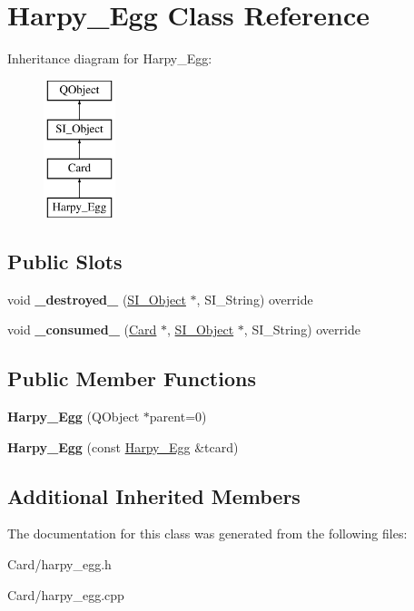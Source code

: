 \hypertarget{class_harpy___egg}{}\section{Harpy\+\_\+\+Egg Class Reference}
\label{class_harpy___egg}
Inheritance diagram for Harpy\+\_\+\+Egg\+:\begin{figure}[H]
\begin{center}
\leavevmode
\includegraphics[height=4.000000cm]{class_harpy___egg}
\end{center}
\end{figure}
\subsection*{Public Slots}
\begin{DoxyCompactItemize}
\item 
\mbox{\label{class_harpy___egg_a39fe155847c9a08db0183bc72f2f457a}} 
void {\bfseries \+\_\+destroyed\+\_\+} (\hyperlink{class_s_i___object}{S\+I\+\_\+\+Object} $\ast$, S\+I\+\_\+\+String) override
\item 
\mbox{\label{class_harpy___egg_ae5e0a841bad38eced0bfff7d5aabf36b}} 
void {\bfseries \+\_\+consumed\+\_\+} (\hyperlink{class_card}{Card} $\ast$, \hyperlink{class_s_i___object}{S\+I\+\_\+\+Object} $\ast$, S\+I\+\_\+\+String) override
\end{DoxyCompactItemize}
\subsection*{Public Member Functions}
\begin{DoxyCompactItemize}
\item 
\mbox{\label{class_harpy___egg_a9f1e87e8509fb727a9476faba45f65a1}} 
{\bfseries Harpy\+\_\+\+Egg} (Q\+Object $\ast$parent=0)
\item 
\mbox{\label{class_harpy___egg_af5c7826d2d59c5c0dba9b262df3e488b}} 
{\bfseries Harpy\+\_\+\+Egg} (const \hyperlink{class_harpy___egg}{Harpy\+\_\+\+Egg} \&tcard)
\end{DoxyCompactItemize}
\subsection*{Additional Inherited Members}


The documentation for this class was generated from the following files\+:\begin{DoxyCompactItemize}
\item 
Card/harpy\+\_\+egg.\+h\item 
Card/harpy\+\_\+egg.\+cpp\end{DoxyCompactItemize}

